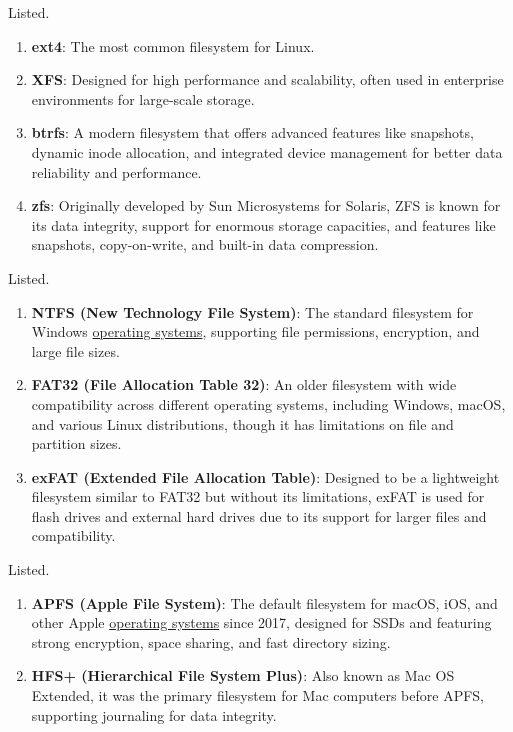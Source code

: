 \documentclass{article}
\newcounter{example}[section]
\begin{document}
  \begin{example}
    \label{ex:linux-filesystems}
    Listed. 
    \begin{enumerate}
      \item \textbf{ext4}: The most common filesystem for Linux. 
      \item \textbf{XFS}: Designed for high performance and scalability, often used in enterprise environments for large-scale storage.
      \item \textbf{btrfs}: A modern filesystem that offers advanced features like snapshots, dynamic inode allocation, and integrated device management for better data reliability and performance. 
      \item \textbf{zfs}: Originally developed by Sun Microsystems for Solaris, ZFS is known for its data integrity, support for enormous storage capacities, and features like snapshots, copy-on-write, and built-in data compression.
    \end{enumerate}
  \end{example}

  \begin{example}
    \label{ex:windows-filesystems}
    Listed. 
    \begin{enumerate} 
      \item \textbf{NTFS (New Technology File System)}: The standard filesystem for Windows \hyperref[def:operating-system]{operating systems}, supporting file permissions, encryption, and large file sizes.
      \item \textbf{FAT32 (File Allocation Table 32)}: An older filesystem with wide compatibility across different operating systems, including Windows, macOS, and various Linux distributions, though it has limitations on file and partition sizes.
      \item \textbf{exFAT (Extended File Allocation Table)}: Designed to be a lightweight filesystem similar to FAT32 but without its limitations, exFAT is used for flash drives and external hard drives due to its support for larger files and compatibility.
    \end{enumerate}
  \end{example}

  \begin{example}
    \label{ex:macos-filesystems}
    Listed. 
    \begin{enumerate}
      \item \textbf{APFS (Apple File System)}: The default filesystem for macOS, iOS, and other Apple \hyperref[def:operating-system]{operating systems} since 2017, designed for SSDs and featuring strong encryption, space sharing, and fast directory sizing.
      \item \textbf{HFS+ (Hierarchical File System Plus)}: Also known as Mac OS Extended, it was the primary filesystem for Mac computers before APFS, supporting journaling for data integrity.
    \end{enumerate}
  \end{example}
\end{document}
